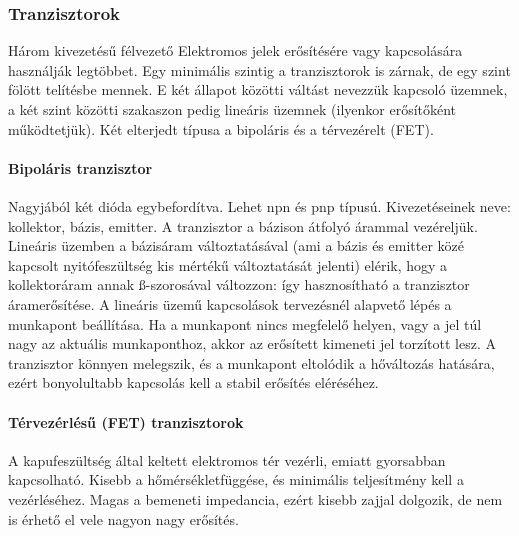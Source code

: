 \subsubsection{Tranzisztorok}
Három kivezetésű félvezető Elektromos jelek erősítésére vagy kapcsolására használják legtöbbet. Egy minimális szintig a tranzisztorok is zárnak, de egy szint fölött telítésbe mennek. E két állapot közötti váltást nevezzük kapcsoló üzemnek, a két szint közötti szakaszon pedig lineáris üzemnek (ilyenkor erősítőként működtetjük). Két elterjedt típusa a bipoláris és a térvezérelt (FET).
\paragraph{Bipoláris tranzisztor}
Nagyjából két dióda egybefordítva. Lehet npn és pnp típusú. Kivezetéseinek neve: kollektor, bázis, emitter. A tranzisztor a bázison átfolyó árammal vezéreljük. Lineáris üzemben a bázisáram változtatásával (ami a bázis és emitter közé kapcsolt nyitófeszültség kis mértékű változtatását jelenti) elérik, hogy a kollektoráram annak ß-szorosával változzon: így hasznosítható a tranzisztor áramerősítése. A lineáris üzemű kapcsolások tervezésnél alapvető lépés a munkapont beállítása. 
Ha a munkapont nincs megfelelő helyen, vagy a jel túl nagy az aktuális munkaponthoz, akkor az erősített kimeneti jel torzított lesz. A tranzisztor könnyen melegszik, és a munkapont eltolódik a hőváltozás hatására, ezért bonyolultabb kapcsolás kell a stabil erősítés eléréséhez.

\paragraph{Térvezérlésű (FET) tranzisztorok}
A kapufeszültség által keltett elektromos tér vezérli, emiatt gyorsabban kapcsolható. Kisebb a hőmérsékletfüggése, és minimális teljesítmény kell a vezérléséhez. Magas a bemeneti impedancia, ezért kisebb zajjal dolgozik, de nem is érhető el vele nagyon nagy erősítés.

